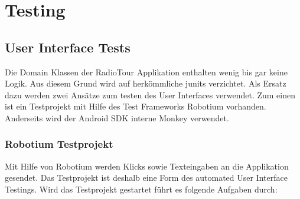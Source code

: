 \chapter{Testing}

\section{User Interface Tests}
Die Domain Klassen der RadioTour Applikation enthalten wenig bis gar keine Logik. Aus diesem Grund wird auf herkömmliche \glspl{junit} verzichtet. Als Ersatz dazu werden zwei Ansätze zum testen des User Interfaces verwendet. Zum einen ist ein Testprojekt mit Hilfe des Test Frameworks Robotium vorhanden. Anderseits wird der Android SDK interne Monkey verwendet.
\subsection{Robotium Testprojekt}
 Mit Hilfe von Robotium werden Klicks sowie Texteingaben an die Applikation gesendet. Das Testprojekt ist deshalb eine Form des automated User Interface Testings. Wird das Testprojekt gestartet führt es folgende Aufgaben durch:

